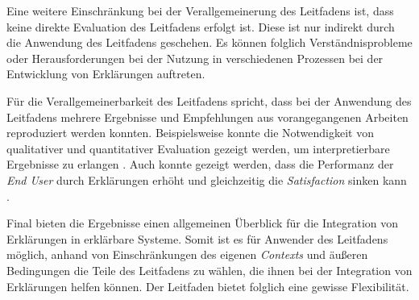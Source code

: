 Eine weitere Einschränkung bei der Verallgemeinerung des Leitfadens ist, dass keine direkte Evaluation des Leitfadens erfolgt ist. Diese ist nur indirekt durch die Anwendung des Leitfadens geschehen. Es können folglich Verständnisprobleme oder Herausforderungen bei der Nutzung in verschiedenen Prozessen bei der Entwicklung von Erklärungen auftreten.

Für die Verallgemeinerbarkeit des Leitfadens spricht, dass bei der Anwendung des Leitfadens mehrere Ergebnisse und Empfehlungen aus vorangegangenen Arbeiten reproduziert werden konnten. Beispielsweise konnte die Notwendigkeit von qualitativer und quantitativer Evaluation gezeigt werden, um interpretierbare Ergebnisse zu erlangen \cite{}. Auch konnte gezeigt werden, dass die Performanz der \textit{End User} durch Erklärungen erhöht und gleichzeitig die \textit{Satisfaction} sinken kann \cite{}. 

Final bieten die Ergebnisse einen allgemeinen Überblick für die Integration von Erklärungen in erklärbare Systeme. Somit ist es für Anwender des Leitfadens möglich, anhand von Einschränkungen des eigenen \textit{Contexts} und äußeren Bedingungen die Teile des Leitfadens zu wählen, die ihnen bei der Integration von Erklärungen helfen können. Der Leitfaden bietet folglich eine gewisse Flexibilität.

\newpage

